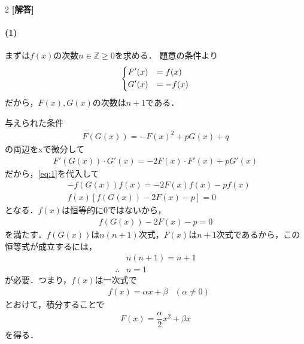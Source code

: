 \documentclass[../../main.tex]{subfiles}
\begin{document}
\setcounter{equation}{0}
\begin{oframed}
  
\end{oframed}
\setlength{\columnseprule}{0.4pt}
\begin{multicols}{2}
  {\bf [解答]}

  \paragraph{(1)}
  まずは$f(x)$の次数$n\in\mathbb{Z}\ge 0$を求める．
  題意の条件より
  \begin{align}
    \begin{dcases}
      F'(x) & =f(x)  \\
      G'(x) & =-f(x)
    \end{dcases} \label{eq:1}
  \end{align}
  だから，$F(x),G(x)$の次数は$n+1$である．

  与えられた条件
  \begin{align}
    F(G(x)) =  -F(x)^2 + pG(x) + q \label{eq:2}
  \end{align}
  の両辺をxで微分して
  \begin{align}
    F'(G(x)) \cdot G'(x) = -2F(x) \cdot F'(x) + pG'(x)
  \end{align}
  だから，\cref{eq:1}を代入して
  \begin{align}
    & -f(G(x)) f(x) = -2F(x)f(x) -pf(x)         \\
    & f(x) \left[f(G(x)) - 2F(x) - p\right] = 0
  \end{align}
  となる．$f(x)$は恒等的に$0$ではないから，
  \begin{align}
    f(G(x)) - 2F(x) - p = 0  \label{eq:3}
  \end{align}
  を満たす．$f(G(x))$は$n(n+1)$次式，$F(x)$は$n+1$次式であるから，この恒等式が成立するには，
  \begin{align}
    & n(n+1) = n+1 \\
    \therefore
    & n=1
  \end{align}
  が必要．つまり，$f(x)$は一次式で
  \begin{align}
    & f(x) = \alpha x + \beta & (\alpha \ne 0) \label{eq:4}
  \end{align}
  とおけて，積分することで
  \begin{align}
    F(x) = \dfrac{\alpha}{2}x^2 + \beta x
  \end{align}
  を得る．


\end{multicols}
\end{document}
